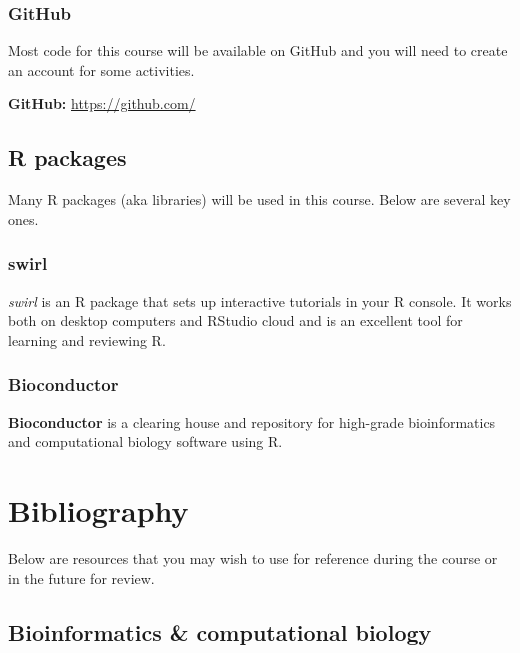 \documentclass[
]{book}
\begin{document}
\hypertarget{github}{%
\subsection{GitHub}\label{github}}

Most code for this course will be available on GitHub and you will need to create an account for some activities.

\textbf{GitHub:} \url{https://github.com/}

\hypertarget{r-packages}{%
\section{R packages}\label{r-packages}}

Many R packages (aka libraries) will be used in this course. Below are several key ones.

\hypertarget{swirl}{%
\subsection{swirl}\label{swirl}}

\emph{swirl} is an R package that sets up interactive tutorials in your R console. It works both on desktop computers and RStudio cloud and is an excellent tool for learning and reviewing R.

\hypertarget{bioconductor}{%
\subsection{Bioconductor}\label{bioconductor}}

\textbf{Bioconductor} is a clearing house and repository for high-grade bioinformatics and computational biology software using R.

\hypertarget{bibliography}{%
\chapter{Bibliography}\label{bibliography}}

Below are resources that you may wish to use for reference during the course or in the future for review.

\hypertarget{bioinformatics-computational-biology}{%
\section{Bioinformatics \& computational biology}\label{bioinformatics-computational-biology}}
\end{document}
